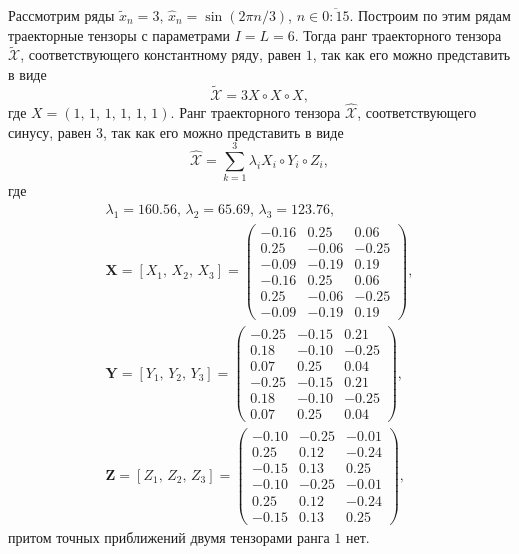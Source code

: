 \documentclass[specialist,
    substylefile = spbu_report.rtx,
    subf,href,colorlinks=true, 12pt]{disser}
\theoremstyle{plain}
\theoremstyle{definition}
\theoremstyle{remark}
\begin{document}
    Рассмотрим ряды $\tilde{x}_n=3,\, \hat{x}_n=\sin(2\pi n / 3)$, $n \in \overline{0:15}$.
    Построим по этим рядам траекторные тензоры с параметрами $I=L=6$.
    Тогда ранг траекторного тензора $\tilde{\mathcal{X}}$, соответствующего константному ряду, равен $1$, так как его
    можно представить в виде
    \[
        \tilde{\mathcal{X}} = 3 X\circ X \circ X,
    \]
    где $X=(1,\, 1,\, 1,\, 1,\, 1,\, 1)$.
    Ранг траекторного тензора $\hat{\mathcal{X}}$, соответствующего синусу, равен $3$, так как его можно представить в виде
    \[
        \hat{\mathcal{X}}=\sum_{k=1}^{3}\lambda_i X_i \circ Y_i\circ Z_i,
    \]
    где
    \begin{gather*}
        \lambda_1 =160.56,\, \lambda_2 =65.69,\, \lambda_3 =123.76,\\
        \mathbf{X}=[X_1,\, X_2,\, X_3] =
        \begin{pmatrix}
            -0.16 & 0.25  & 0.06  \\
            0.25  & -0.06 & -0.25 \\
            -0.09 & -0.19 & 0.19  \\
            -0.16 & 0.25  & 0.06  \\
            0.25  & -0.06 & -0.25 \\
            -0.09 & -0.19 & 0.19
        \end{pmatrix},\\
        \mathbf{Y}=[Y_1,\, Y_2,\, Y_3] =
        \begin{pmatrix}
            -0.25 & -0.15 & 0.21  \\
            0.18  & -0.10 & -0.25 \\
            0.07  & 0.25  & 0.04  \\
            -0.25 & -0.15 & 0.21  \\
            0.18  & -0.10 & -0.25 \\
            0.07  & 0.25  & 0.04
        \end{pmatrix},\\
        \mathbf{Z}=[Z_1,\, Z_2,\, Z_3] =
        \begin{pmatrix}
            -0.10 & -0.25 & -0.01 \\
            0.25  & 0.12  & -0.24 \\
            -0.15 & 0.13  & 0.25  \\
            -0.10 & -0.25 & -0.01 \\
            0.25  & 0.12  & -0.24 \\
            -0.15 & 0.13  & 0.25
        \end{pmatrix},
    \end{gather*}
    притом точных приближений двумя тензорами ранга $1$ нет.
\end{document}
